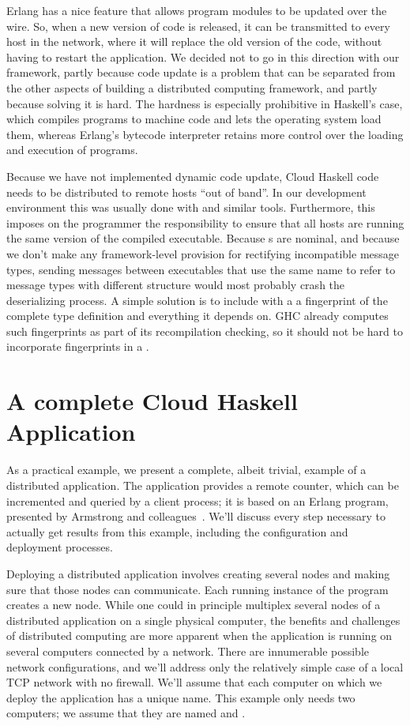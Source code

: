 \documentclass[preprint]{sigplanconf}
\begin{document}
Erlang has a nice feature that allows program modules to be updated over the wire. So, when a new version of code is released, it can be transmitted to every host in the network, where it will replace the old version of the code, without having to restart the application. We decided not to go in this direction with our framework, partly because code update is a problem that can be separated from the other aspects of building a distributed computing framework, and partly because solving it is hard. The hardness is especially prohibitive in Haskell's case, which compiles programs to machine code and lets the operating system load them, whereas Erlang's bytecode interpreter retains more control over the loading and execution of programs.

Because we have not implemented dynamic code update, Cloud Haskell code needs to be distributed to remote hosts ``out of band''. In our development environment this was usually done with  and similar tools. Furthermore, this imposes on the programmer the responsibility to ensure that all hosts are running the same version of the compiled executable.  Because s are nominal, and because we don't make any framework-level provision for rectifying incompatible message types, sending messages between executables that use the same name to refer to message types with different structure would most probably crash the deserializing process.  A simple solution is to include with a  a fingerprint of the complete type definition and everything it depends on.  GHC already computes such fingerprints as part of its recompilation checking, so it should not be hard to incorporate fingerprints in a .


\section{A complete Cloud Haskell Application}
\label{s:completeApp}
As a practical example, we present a complete, albeit trivial, example of a distributed application. 
The application provides a remote counter, which can be incremented and queried by a client process; it is based on an Erlang program, presented by Armstrong and colleagues~\cite{Erlang93}. 
We'll discuss every step necessary to actually get results from this example, including the configuration and deployment processes.

Deploying a distributed application involves creating several nodes and making sure that those nodes can communicate. Each running instance of the program creates a new node. While one could in principle multiplex several nodes of a distributed application on a single physical computer, the benefits and challenges of distributed computing are more apparent when the application is running on several computers connected by a network. There are innumerable possible network configurations, and we'll address only the relatively simple case of a local TCP network with no firewall. We'll assume that each computer on which we deploy the application has a unique name. This example only needs two computers; we assume that they are named  and .
\end{document}
